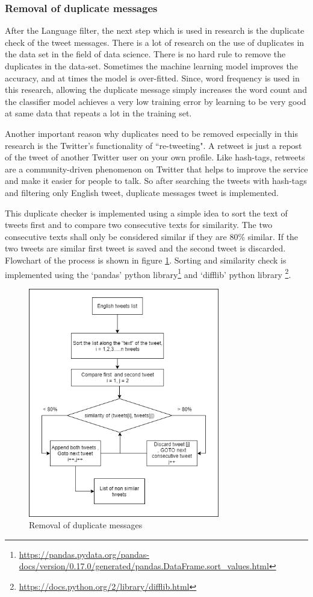 \subsubsection{Removal of duplicate messages}
After the Language filter, the next step which is used in research is the duplicate check of the tweet messages. There is a lot of research on the use of duplicates in the data set in the field of data science. There is no hard rule to remove the duplicates in the data-set. Sometimes the machine learning model improves the accuracy, and at times the model is over-fitted. Since, word frequency is used in this research, allowing the duplicate message simply increases the word count and the classifier model
achieves a very low training error by learning to be very good at same data that repeats a lot in the training set.

Another important reason why duplicates need to be removed especially in this research is the Twitter's functionality of ``re-tweeting". A retweet is just a repost of the tweet of another Twitter user on your own profile. Like hash-tags, retweets are a community-driven phenomenon on Twitter that helps to improve the service and make it easier for people to talk. So after searching the tweets with hash-tags and filtering only English tweet, duplicate messages tweet is implemented.

This duplicate checker is implemented using a simple idea to sort the text of tweets first and to compare two consecutive texts for similarity. The two consecutive texts shall only be considered similar if they are 80\% similar. If the two tweets are similar first tweet is saved and the second tweet is discarded. Flowchart of the process is shown in figure \ref{fig:duplicatechk}. Sorting and similarity check is implemented using the `pandas' python library\footnote{\url{https://pandas.pydata.org/pandas-docs/version/0.17.0/generated/pandas.DataFrame.sort_values.html}} and `difflib' python library \footnote{\url{https://docs.python.org/2/library/difflib.html}}.

\begin{figure}
    \centering
    \includegraphics[width=10cm\linewidth,height=10cm]{thesis_template/images/duplicatecheck.png}
    \caption{Removal of duplicate messages}
    \label{fig:duplicatechk}
\end{figure}

